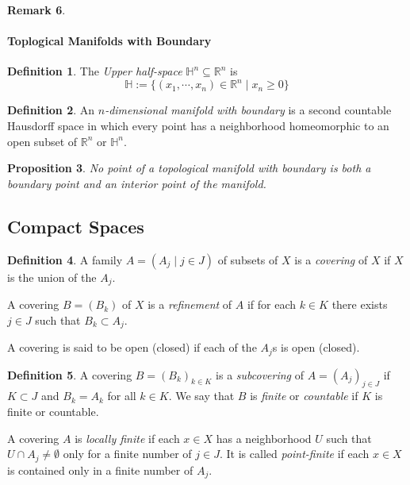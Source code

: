 \documentclass[11pt,a4paper]{article}
\theoremstyle{definition}
\newtheorem{definition}{Definition}[section]
\newtheorem{remark}[definition]{Remark}
\theoremstyle{plain}
\newtheorem{proposition}[definition]{Proposition}
\theoremstyle{remark}
\begin{document}
\begin{remark}
\paragraph{Toplogical Manifolds with Boundary} 

\begin{definition}
  The \emph{Upper half-space} $\mathbb{H}^n \subseteq \mathbb{R}^n$ is 
  $$\mathbb{H} := \{(x_1, \cdots, x_n) \in \mathbb{R}^n \mid x_n \geq 0\}$$
\end{definition}

\begin{definition}
  An \emph{$n$-dimensional manifold with boundary} is a second countable Hausdorff space in which 
  every point has a neighborhood homeomorphic to an open subset of $\mathbb{R}^n$ or $\mathbb{H}^n$. 
\end{definition}

\begin{proposition}
  No point of a topological manifold with boundary is both a boundary point and an interior point of the manifold.
\end{proposition}

\subsection{Compact Spaces}
\begin{definition}
  A family $A = (A_j \mid j \in J)$ of subsets of $X$ is a \emph{covering} of $X$ if $X$ is the union of the 
  $A_j$. 

  A covering $B = (B_k)$ of $X$ is a \emph{refinement} of $A$ if for each $k \in K$ there exists $j \in J$ such that $B_k \subset A_j$.

  A covering is said to be open (closed) if each of the $A_j$s is open (closed). 
\end{definition}

\begin{definition}
  A covering $B = (B_k)_{k \in K}$ is a \emph{subcovering} of $A = (A_j)_{j \in J}$ if $K \subset J$ and $B_k = A_k$ for all $k \in K$. We say that 
  $B$ is \emph{finite} or \emph{countable} if $K$ is finite or countable. 

  A covering $A$ is \emph{locally finite} if each $x \in X$ has a neighborhood $U$ such that $U \cap A_j \neq \emptyset$ only for 
  a finite number of $j \in J$. It is called \emph{point-finite} if each $x \in X$ is contained only in a finite number of $A_j$. 
\end{definition}


\end{remark}
\end{document}
